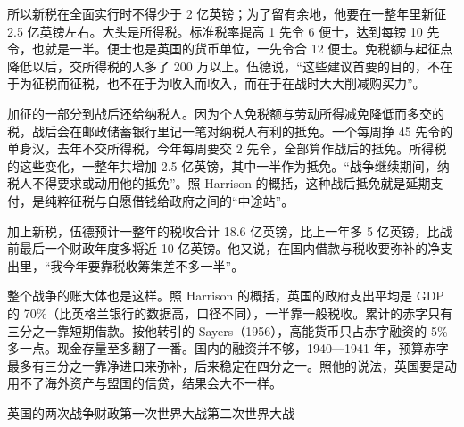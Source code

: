 所以新税在全面实行时不得少于 2 亿英镑；为了留有余地，他要在一整年里新征 2.5 亿英镑左右\cite{hansard1941}。大头是所得税。标准税率提高 1 先令 6 便士，达到每镑 10 先令，也就是一半\cite{hansard1941}。便士也是英国的货币单位，一先令合 12 便士。免税额与起征点降低以后，交所得税的人多了 200 万以上\cite{hansard1941}。伍德说，“这些建议首要的目的，不在于为征税而征税，也不在于为收入而收入，而在于在战时大大削减购买力”\cite{hansard1941}。

加征的一部分到战后还给纳税人。因为个人免税额与劳动所得减免降低而多交的税，战后会在邮政储蓄银行里记一笔对纳税人有利的抵免\cite{hansard1941}。一个每周挣 45 先令的单身汉，去年不交所得税，今年每周要交 2 先令，全部算作战后的抵免\cite{hansard1941}。所得税的这些变化，一整年共增加 2.5 亿英镑，其中一半作为抵免\cite{hansard1941}。“战争继续期间，纳税人不得要求或动用他的抵免”\cite{hansard1941}。照 Harrison 的概括，这种战后抵免就是延期支付，是纯粹征税与自愿借钱给政府之间的“中途站”\cite{harrison1992}。

加上新税，伍德预计一整年的税收合计 18.6 亿英镑，比上一年多 5 亿英镑，比战前最后一个财政年度多将近 10 亿英镑\cite{hansard1941}。他又说，在国内借款与税收要弥补的净支出里，“我今年要靠税收筹集差不多一半”\cite{hansard1941}。

整个战争的账大体也是这样。照 Harrison 的概括，英国的政府支出平均是 GDP 的 70\%（比英格兰银行的数据高，口径不同），一半靠一般税收\cite{harrison1992}。累计的赤字只有三分之一靠短期借款。按他转引的 Sayers（1956），高能货币只占赤字融资的 5\% 多一点\cite{harrison1992}。现金存量至多翻了一番\cite{harrison1992}。国内的融资并不够，1940—1941 年，预算赤字最多有三分之一靠净进口来弥补，后来稳定在四分之一\cite{harrison1992}。照他的说法，英国要是动用不了海外资产与盟国的信贷，结果会大不一样\cite{harrison1992}。

\begin{compare}{英国的两次战争财政}{第一次世界大战}{第二次世界大战}
\end{compare}

